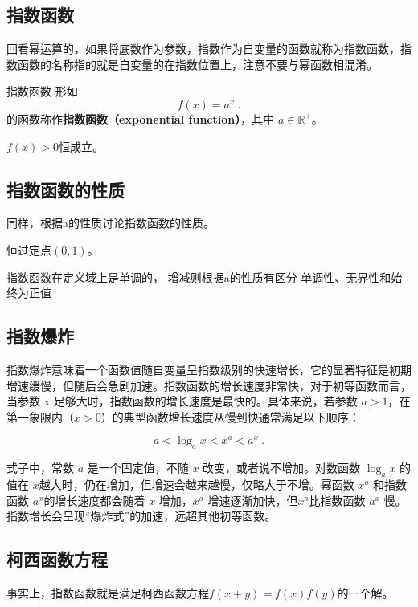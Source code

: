 \subsection{指数函数}

回看幂运算的，如果将底数作为参数，指数作为自变量的函数就称为指数函数，指数函数的名称指的就是自变量的在指数位置上，注意不要与幂函数相混淆。

\begin{definition}{指数函数}
形如
\begin{equation}
f(x) = a^x~.
\end{equation}
的函数称作\textbf{指数函数（exponential function）}，其中 $a\in\mathbb R^+$。
\end{definition}

$f(x)>0$恒成立。

\subsection{指数函数的性质}

同样，根据a的性质讨论指数函数的性质。

恒过定点$(0,1)$。

指数函数在定义域上是单调的，
增减则根据a的性质有区分
单调性、无界性和始终为正值

\subsection{指数爆炸}

指数爆炸意味着一个函数值随自变量呈指数级别的快速增长，它的显著特征是初期增速缓慢，但随后会急剧加速。指数函数的增长速度非常快，对于初等函数而言，当参数 x 足够大时，指数函数的增长速度是最快的。具体来说，若参数 $a > 1$，在第一象限内（$x > 0$）的典型函数增长速度从慢到快通常满足以下顺序：

\begin{equation}
 a < \log_a{x} <x^a < a^x~.
\end{equation}

式子中，常数 $a$ 是一个固定值，不随 $x$ 改变，或者说不增加。对数函数 $\log_a{x}$ 的值在 $x$越大时，仍在增加，但增速会越来越慢，仅略大于不增。幂函数 $x^a$ 和指数函数 $a^x$的增长速度都会随着 $x$ 增加，$x^a$ 增速逐渐加快，但$x^a$比指数函数 $a^x$ 慢。指数增长会呈现“爆炸式”的加速，远超其他初等函数。

\subsection{柯西函数方程}

事实上，指数函数就是满足柯西函数方程$f(x+y)=f(x)f(y)$的一个解。